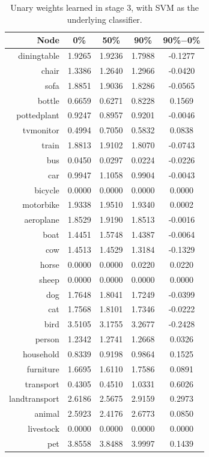 \documentclass[11pt,a4paper]{article}
\begin{document}
\begin{table}[htbp]
\centering
\begin{tabular}{r|c|c|c|c}
Node & 0\% & 50\% & 90\% & 90\%$-$0\%\\\hline
diningtable   & 1.9265 & 1.9236 & 1.7988 & -0.1277\\
chair         & 1.3386 & 1.2640 & 1.2966 & -0.0420\\
sofa          & 1.8851 & 1.9036 & 1.8286 & -0.0565\\
bottle        & 0.6659 & 0.6271 & 0.8228 & 0.1569\\
pottedplant   & 0.9247 & 0.8957 & 0.9201 & -0.0046\\
tvmonitor     & 0.4994 & 0.7050 & 0.5832 & 0.0838\\
train         & 1.8813 & 1.9102 & 1.8070 & -0.0743\\
bus           & 0.0450 & 0.0297 & 0.0224 & -0.0226\\
car           & 0.9947 & 1.1058 & 0.9904 & -0.0043\\
bicycle       & 0.0000 & 0.0000 & 0.0000 & 0.0000\\
motorbike     & 1.9338 & 1.9510 & 1.9340 & 0.0002\\
aeroplane     & 1.8529 & 1.9190 & 1.8513 & -0.0016\\
boat          & 1.4451 & 1.5748 & 1.4387 & -0.0064\\
cow           & 1.4513 & 1.4529 & 1.3184 & -0.1329\\
horse         & 0.0000 & 0.0000 & 0.0220 & 0.0220\\
sheep         & 0.0000 & 0.0000 & 0.0000 & 0.0000\\
dog           & 1.7648 & 1.8041 & 1.7249 & -0.0399\\
cat           & 1.7568 & 1.8101 & 1.7346 & -0.0222\\
bird          & 3.5105 & 3.1755 & 3.2677 & -0.2428\\
person        & 1.2342 & 1.2741 & 1.2668 & 0.0326\\\hline
household     & 0.8339 & 0.9198 & 0.9864 & 0.1525\\
furniture     & 1.6695 & 1.6110 & 1.7586 & 0.0891\\
transport     & 0.4305 & 0.4510 & 1.0331 & 0.6026\\
landtransport & 2.6186 & 2.5675 & 2.9159 & 0.2973\\
animal        & 2.5923 & 2.4176 & 2.6773 & 0.0850\\
livestock     & 0.0000 & 0.0000 & 0.0000 & 0.0000\\
pet           & 3.8558 & 3.8488 & 3.9997 & 0.1439
\end{tabular}
\caption{Unary weights learned in stage 3, with SVM as the underlying classifier.}
\label{tab:svmunary}
\end{table}
\end{document}
